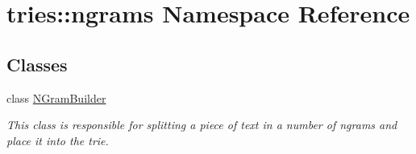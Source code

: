 \hypertarget{namespacetries_1_1ngrams}{}\section{tries\+:\+:ngrams Namespace Reference}
\label{namespacetries_1_1ngrams}
\subsection*{Classes}
\begin{DoxyCompactItemize}
\item 
class \hyperlink{classtries_1_1ngrams_1_1_n_gram_builder}{N\+Gram\+Builder}
\begin{DoxyCompactList}\small\item\em This class is responsible for splitting a piece of text in a number of ngrams and place it into the trie. \end{DoxyCompactList}\end{DoxyCompactItemize}
